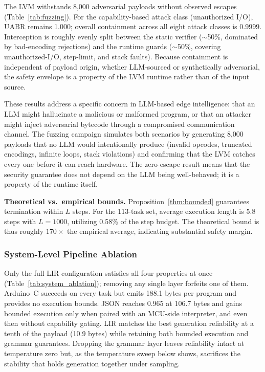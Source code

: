 \documentclass[a4paper,fleqn,longmktitle]{cas-dc}
\begin{document}
The LVM withstands 8{,}000 adversarial payloads without observed escapes (Table~\ref{tab:fuzzing}). For the capability-based attack class (unauthorized I/O), UABR remains 1.000; overall containment across all eight attack classes is 0.9999. Interception is roughly evenly split between the static verifier ($\sim$50\%, dominated by bad-encoding rejections) and the runtime guards ($\sim$50\%, covering unauthorized-I/O, step-limit, and stack faults). Because containment is independent of payload origin, whether LLM-sourced or synthetically adversarial, the safety envelope is a property of the LVM runtime rather than of the input source.

These results address a specific concern in LLM-based edge intelligence: that an LLM might hallucinate a malicious or malformed program, or that an attacker might inject adversarial bytecode through a compromised communication channel. The fuzzing campaign simulates both scenarios by generating 8{,}000 payloads that no LLM would intentionally produce (invalid opcodes, truncated encodings, infinite loops, stack violations) and confirming that the LVM catches every one before it can reach hardware. The zero-escape result means that the security guarantee does not depend on the LLM being well-behaved; it is a property of the runtime itself.

\textbf{Theoretical vs.\ empirical bounds.} Proposition~\ref{thm:bounded} guarantees termination within $L$ steps. For the 113-task set, average execution length is 5.8 steps with $L{=}1000$, utilizing 0.58\% of the step budget. The theoretical bound is thus roughly $170\times$ the empirical average, indicating substantial safety margin.

\subsubsection{System-Level Pipeline Ablation}
\label{sec:ablation_system}

Only the full LIR configuration satisfies all four properties at once (Table~\ref{tab:system_ablation}); removing any single layer forfeits one of them. Arduino~C succeeds on every task but emits 188.1 bytes per program and provides no execution bounds. JSON reaches 0.965 at 106.7 bytes and gains bounded execution only when paired with an MCU-side interpreter, and even then without capability gating. LIR matches the best generation reliability at a tenth of the payload (10.9 bytes) while retaining both bounded execution and grammar guarantees. Dropping the grammar layer leaves reliability intact at temperature zero but, as the temperature sweep below shows, sacrifices the stability that holds generation together under sampling.
\end{document}
